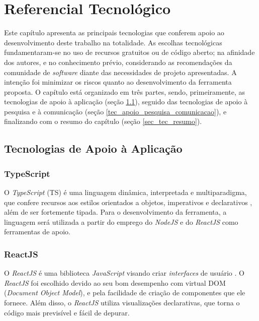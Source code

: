 \chapter[Referencial Tecnológico]{Referencial Tecnológico}

\label{chap:referencial_tecnologico}

Este capítulo apresenta as principais tecnologias que conferem apoio ao desenvolvimento deste trabalho na totalidade. As escolhas tecnológicas fundamentaram-se no uso de recursos gratuitos ou de código aberto; na afinidade dos autores, e no conhecimento prévio, considerando as recomendações da comunidade de \textit{software} diante das necessidades de projeto apresentadas. A intenção foi minimizar os riscos quanto ao desenvolvimento da ferramenta proposta. O capítulo está organizado em três partes, sendo, primeiramente, as tecnologias de apoio à aplicação (seção \ref{tec_apoio_app}), seguido das tecnologias de apoio à pesquisa e à comunicação (seção \ref{tec_apoio_pesquisa_comunicacao}), e finalizando com o resumo do capítulo (seção \ref{sec_tec_resumo}).

\section{Tecnologias de Apoio à Aplicação}

\label{tec_apoio_app}

\subsection{TypeScript}
O \textit{TypeScript} (TS) é uma linguagem dinâmica, interpretada e multiparadigma, que confere recursos aos estilos orientados a objetos, imperativos e declarativos \cite{typescript}, além de ser fortemente tipada. Para o desenvolvimento da ferramenta, a linguagem será utilizada a partir do emprego do \textit{NodeJS} e do \textit{ReactJS} como ferramentas de apoio.

\subsection{ReactJS}
O \textit{ReactJS} é uma biblioteca \textit{JavaScript} visando criar \textit{interfaces} de usuário \cite{reactjs}. O \textit{ReactJS} foi escolhido devido ao seu bom desempenho com virtual DOM (\textit{Document Object Model}), e pela facilidade de criação de componentes que ele fornece. Além disso, o \textit{ReactJS} utiliza visualizações declarativas, que torna o código mais previsível e fácil de depurar.

